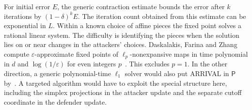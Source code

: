 \begin{remark}\label{rem:ueopl-nopoly}
For initial error $E$, the generic contraction estimate bounds the error
after $k$ iterations by $(1-\delta)^k E$. The iteration count obtained
from this estimate can be exponential in $L$. Within a known choice of affine pieces the fixed point solves a rational linear
system. The difficulty is identifying the pieces when the solution lies on or near changes in the
attackers' choices. Daskalakis, Farina and Zhang compute $\varepsilon$-approximate fixed points of
$\ell_p$-nonexpansive maps in time polynomial in $d$ and $\log(1/\varepsilon)$ for even integers
$p$~\cite{dfz26}. This excludes $p=1$.  In the other direction, a generic polynomial-time $\ell_1$ solver would also put ARRIVAL in
$\mathsf P$ by~\cite{haslebacher25}. A targeted algorithm would have to exploit the special structure
here, including the simplex projections in the attacker update and the
separate cutoff coordinate in the defender update.
\end{remark}

